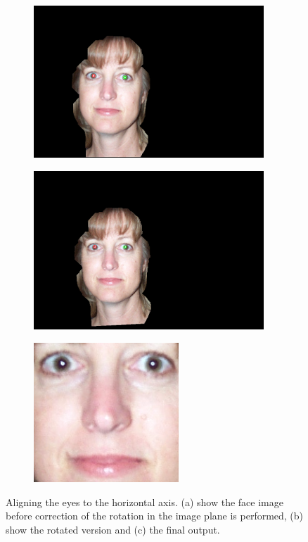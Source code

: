 \begin{figure}[H]
\begin{subfigure}{.33\textwidth}
  \centering
  \includegraphics[width=0.95\textwidth]{img/fd2/BeforeRotated.png}
  \caption{}
\end{subfigure}%
\begin{subfigure}{.33\textwidth}
  \centering
  \includegraphics[width=0.95\textwidth]{img/fd2/AfterRotated.png}
  \caption{}
\end{subfigure}%
\begin{subfigure}{.33\textwidth}
  \centering
  \includegraphics[width=0.6\textwidth]{img/fd2/output12.png}
  \caption{}
\end{subfigure}%

\caption{Aligning the eyes to the horizontal axis. (a) show the face image before correction of the rotation in the image plane is performed, (b) show the rotated version and (c) the final output.}
\label{fig:rotationAndOutput}
\end{figure}


